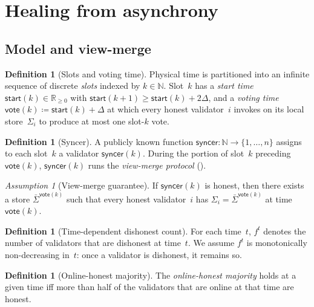 \documentclass{article}
\newcommand{\syncer}{\mathsf{syncer}}
\newcommand{\start}{\mathsf{start}}
\newcommand{\vote}{\mathsf{vote}}
\newcommand{\comm}[1]{\bar{#1}}
\theoremstyle{plain}
\theoremstyle{definition}
\newtheorem{definition}[theorem]{Definition}
\theoremstyle{remark}
\newtheorem{assumption}[theorem]{Assumption}
\newcommand{\OHM}{online-honest majority\xspace}
\begin{document}
\section{Healing from asynchrony}\label{sec:healing}

\subsection{Model and view-merge}\label{rev:sec:healing-model}

\begin{definition}[Slots and voting time]\label{rev:def:slots}
Physical time is partitioned into an infinite sequence of discrete \emph{slots} indexed by $k \in \mathbb{N}$.
Slot~$k$ has a \emph{start time} $\start(k) \in \mathbb{R}_{\geq 0}$ with $\start(k+1) \geq \start(k) + 2\Delta$, and a \emph{voting time} $\vote(k) \coloneqq \start(k) + \Delta$ at which every honest validator~$i$ invokes  on its local store~$\Sigma_i$ to produce at most one slot-$k$ vote.
\end{definition}

\begin{definition}[Syncer]\label{rev:def:syncer}
A publicly known function $\syncer \colon \mathbb{N} \to \{1, \ldots, n\}$ assigns to each slot~$k$ a validator $\syncer(k)$.
During the portion of slot~$k$ preceding $\vote(k)$, $\syncer(k)$ runs the \emph{view-merge protocol} ().
\end{definition}

\begin{assumption}[View-merge guarantee]\label{rev:ass:view-merge}
If $\syncer(k)$ is honest, then there exists a store $\comm{\Sigma}^{\vote(k)}$ such that every honest validator~$i$ has $\Sigma_i = \comm{\Sigma}^{\vote(k)}$ at time $\vote(k)$.
\end{assumption}

\begin{definition}[Time-dependent dishonest count]\label{rev:def:f-t}
For each time~$t$, $f^t$ denotes the number of validators that are dishonest at time~$t$. We assume $f^t$ is monotonically non-decreasing in~$t$: once a validator is dishonest, it remains so.
\end{definition}

\begin{definition}[Online-honest majority]\label{rev:def:online-honest-majority}
The \emph{\OHM} holds at a given time iff more than half of the validators that are online at that time are honest.
\end{definition}
\end{document}
